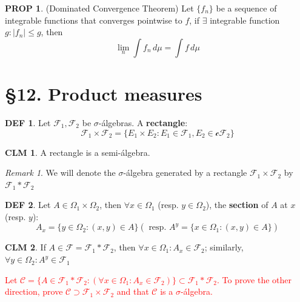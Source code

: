 \documentclass[hidelinks]{article}
\theoremstyle{definition}
\newtheorem*{defin}{DEF}
\theoremstyle{dotless}
\newtheorem{proposition}{PROP}[section]
\newtheorem{claim}{CLM}[section]
\theoremstyle{remark}
\newtheorem*{remark}{Remark}
\begin{document}
\begin{proposition}(Dominated Convergence Theorem) Let $\{f_n\}$ be a sequence of integrable functions that converges pointwise to $f$, if $\exists$ integrable function $g:|f_n|\leq g$, then
\[\lim_n\int f_n\,d\mu=\int f\,d\mu\]

\end{proposition}

\bigbreak

\section*{\S12. Product measures}
\setcounter{section}{12}

\begin{defin}
Let $\mathscr{F}_1,\mathscr{F}_2$ be $\sigma$-álgebras. A \textbf{rectangle}:
\[\mathscr{F}_1\times\mathscr{F}_2=\{E_1\times E_2:E_1\in\mathscr{F}_1,E_2\in\mathscr{cF}_2\}\]
\end{defin}

\begin{claim}
A rectangle is a semi-álgebra.
\end{claim}

\begin{remark}
We will denote the $\sigma$-álgebra generated by a rectangle $\mathscr{F}_1\times\mathscr{F}_2$ by $\mathscr{F}_1\ast\mathscr{F}_2$
\end{remark}

\begin{defin}
Let $A\in\Omega_1\times\Omega_2$, then $\forall x\in\Omega_1$ (resp. $y\in\Omega_2$), the \textbf{section} of $A$ at $x$ (resp. $y$):
\[A_x=\{y\in\Omega_2:(x,y)\in A\}(\textrm{ resp. }A^y=\{x\in\Omega_1:(x,y)\in A\})\]
\end{defin}

\begin{claim}
If $A\in\mathscr{F}=\mathscr{F}_1\ast\mathscr{F}_2$, then $\forall x\in\Omega_1:A_x\in\mathscr{F}_2$; similarly, $\forall y\in\Omega_2:A^y\in\mathscr{F}_1$
\end{claim}
\textcolor{red}{Let $\mathscr{C}=\{A\in\mathscr{F}_1\ast\mathscr{F}_2:(\forall x\in\Omega_1:A_x\in\mathscr{F}_2)\}\subset\mathscr{F}_1\ast\mathscr{F}_2$. To prove the other direction, prove $\mathscr{C}\supset\mathscr{F}_1\times\mathscr{F}_2$ and that $\mathscr{C}$ is a $\sigma$-álgebra.}
\end{document}
